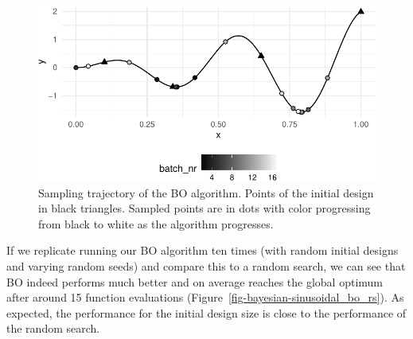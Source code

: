 \begin{figure}

{\centering \includegraphics[width=1\textwidth,height=\textheight]{chapters/chapter5/advanced_tuning_methods_and_black_box_optimization_files/figure-pdf/fig-bayesian-optimization-sampling-1.pdf}

}

\caption{\label{fig-bayesian-optimization-sampling}Sampling trajectory
of the BO algorithm. Points of the initial design in black triangles.
Sampled points are in dots with color progressing from black to white as
the algorithm progresses.}

\end{figure}

If we replicate running our BO algorithm ten times (with random initial
designs and varying random seeds) and compare this to a random search,
we can see that BO indeed performs much better and on average reaches
the global optimum after around 15 function evaluations
(Figure~\ref{fig-bayesian-sinusoidal_bo_rs}). As expected, the
performance for the initial design size is close to the performance of
the random search.

